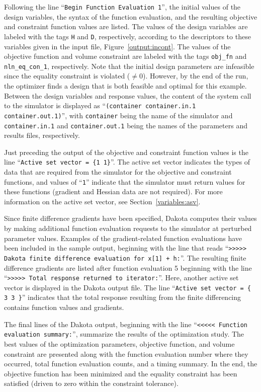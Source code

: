 Following the line ``\texttt{Begin Function Evaluation 1}'', the
initial values of the design variables, the syntax of the function
evaluation, and the resulting objective and constraint function values
are listed. The values of the design variables are labeled with the
tags \texttt{H} and \texttt{D}, respectively, according to the
descriptors to these variables given in the input file,
Figure~\ref{output:incont}.  The values of the objective function
and volume constraint are labeled with the tags
\texttt{obj\_fn} and \texttt{nln\_eq\_con\_1}, respectively. Note that
the initial design parameters are infeasible since the equality
constraint is violated ($\ne 0$). However, by the end of the run, the
optimizer finds a design that is both feasible and optimal for this
example. Between the design variables and response values, the content
of the system call to the simulator is displayed as
``\texttt{(container container.in.1 container.out.1)}'', with
\texttt{container} being the name of the simulator and
\texttt{container.in.1} and \texttt{container.out.1} being the names
of the parameters and results files, respectively.

Just preceding the output of the objective and constraint function
values is the line ``\texttt{Active set vector = \{1 1\}}''. The
active set vector indicates the types of data that are required from
the simulator for the objective and constraint functions, and values
of ``\texttt{1}'' indicate that the simulator must return values for
these functions (gradient and Hessian data are not required). For more
information on the active set vector, see Section~\ref{variables:asv}.

Since finite difference gradients have been specified, Dakota computes
their values by making additional function evaluation requests to the
simulator at perturbed parameter values. Examples of the
gradient-related function evaluations have been included in the sample
output, beginning with the line that reads ``\texttt{>>>>> Dakota
  finite difference evaluation for x[1] + h:}''. The resulting finite
difference gradients are listed after function evaluation 5 beginning
with the line ``\texttt{>>>>> Total response returned to iterator:}''.
Here, another active set vector is displayed in the Dakota output
file. The line ``\texttt{Active set vector = \{ 3 3 \}}'' indicates
that the total response resulting from the finite differencing
contains function values and gradients.

The final lines of the Dakota output, beginning with the line
``\texttt{<<<<< Function evaluation summary:}'', summarize the
results of the optimization study. The best values of the optimization
parameters, objective function, and volume constraint are presented
along with the function evaluation number where they occurred, total
function evaluation counts, and a timing summary. In the end, the
objective function has been minimized and the equality constraint has
been satisfied (driven to zero within the constraint tolerance).

